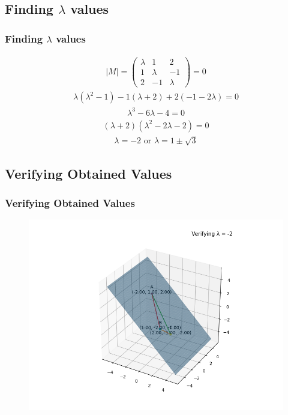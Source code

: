 \documentclass{beamer}
\providecommand{\brak}[1]{\ensuremath{\left(#1\right)}}
\theoremstyle{remark}
\providecommand{\abs}[1]{\left\vert#1\right\vert}
\newcommand{\myvec}[1]{\ensuremath{\begin{pmatrix}#1\end{pmatrix}}}
\numberwithin{equation}{section}
\begin{document}
\subsection{Finding $\lambda$ values}
\begin{frame}
\frametitle{Finding $\lambda$ values}
	\begin{align}
		\abs{M} = \myvec{\lambda & 1 & 2 \\ 1 & \lambda & -1 \\ 2 & -1 & \lambda} = 0 \label{eq1.1.6.19.3}
	\end{align}
	\begin{align}
		\lambda\brak{\lambda^2 - 1} - 1\brak{\lambda+2} + 2\brak{-1-2\lambda} = 0  \label{eq1.1.6.19.4}
	\end{align}
	\begin{align}
		\lambda^3 - 6\lambda - 4 = 0  \label{eq1.1.6.19.5}
	\end{align}
	\begin{align}
		\brak{\lambda + 2}\brak{\lambda^2 - 2\lambda - 2} = 0  \label{eq1.1.6.19.6}
	\end{align}
	\begin{align}
		\lambda = -2 \text{ or } \lambda = 1 \pm \sqrt{3}\label{eq1.1.6.19.6}
	\end{align}
\end{frame}
\subsection{Verifying Obtained Values}

\begin{frame}[fragile]
	\frametitle{Verifying Obtained Values}
	\begin{figure}[h]
		\centering
		\includegraphics[width=0.7\linewidth]{figs/fig1.png}
		\caption{}
		\label{graph1}
	\end{figure}
\end{frame}
\end{document}
